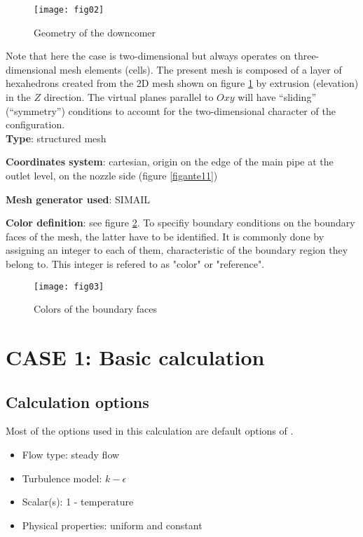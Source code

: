 \begin{figure}[h!]
\begin{center}
\texttt{[image: fig02]}
\caption{Geometry of the downcomer}
\label{figante12}
\end{center}
\end{figure}

Note that here the case is two-dimensional but \CS always operates on three-dimensional
mesh elements (cells). The present mesh is composed of a layer of hexahedrons
created from the 2D mesh shown on figure \ref{figante12} by
extrusion (elevation) in the $Z$ direction. The virtual planes
parallel to $Oxy$ will have ``sliding'' (``symmetry'') conditions to account for
the two-dimensional character of the configuration.\\

{\bfseries Type}: structured mesh

{\bfseries Coordinates system}: cartesian, origin on the edge of the main
pipe at the outlet level, on the nozzle side (figure \ref{figante11})

{\bfseries Mesh generator used}: SIMAIL

{\bfseries Color definition}: see figure \ref{figante13}. To specifiy boundary
conditions on the boundary faces of the mesh, the latter have to be
identified. It is commonly done by assigning an integer to each of them,
characteristic of the boundary region they belong to. This integer is refered to
as "color" or "reference".

\begin{figure}[ht]
\begin{center}
\texttt{[image: fig03]}
\caption{Colors of the boundary faces}
\label{figante13}
\end{center}
\end{figure}


\section{CASE 1: Basic calculation}

        \subsection{Calculation options}

Most of the options used in this calculation are default options of \CS.
\begin{itemize}
\renewcommand{\labelitemi}{$\rightarrow$}
        \item Flow type: steady flow
        \item Turbulence model: $k-\epsilon$
        \item Scalar(s): 1 - temperature
        \item Physical properties: uniform and constant
\end{itemize}


